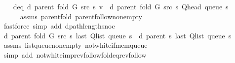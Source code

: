 \begin{isabellebody}
\ \ \isamarkupfalse%
\ d{\isacharunderscore}{\kern0pt}eq{\isacharcolon}{\kern0pt}\ {\isachardoublequoteopen}d\ {\isacharparenleft}{\kern0pt}parent\ {\isacharparenleft}{\kern0pt}fold\ G\ src\ s{\isacharparenright}{\kern0pt}{\isacharparenright}{\kern0pt}\ v\ {\isacharequal}{\kern0pt}\ d\ {\isacharparenleft}{\kern0pt}parent\ {\isacharparenleft}{\kern0pt}fold\ G\ src\ s{\isacharparenright}{\kern0pt}{\isacharparenright}{\kern0pt}\ {\isacharparenleft}{\kern0pt}Q{\isacharunderscore}{\kern0pt}head\ {\isacharparenleft}{\kern0pt}queue\ s{\isacharparenright}{\kern0pt}{\isacharparenright}{\kern0pt}\ {\isacharplus}{\kern0pt}\ {}{\isachardoublequoteclose}\isanewline
\ \ \ \ \isamarkupfalse%
\ assms{\isacharparenleft}{\kern0pt}{}{\isacharparenright}{\kern0pt}\ parent{\isacharunderscore}{\kern0pt}fold\ parent{\isachardot}{\kern0pt}follow{\isacharunderscore}{\kern0pt}non{\isacharunderscore}{\kern0pt}empty\isanewline
\ \ \ \ \isamarkupfalse%
\ {\isacharparenleft}{\kern0pt}fastforce\ simp\ add{\isacharcolon}{\kern0pt}\ dpath{\isacharunderscore}{\kern0pt}length{\isacharunderscore}{\kern0pt}snoc{\isacharparenright}{\kern0pt}\isanewline
\isanewline
\ \ \isamarkupfalse%
\ {\isachardoublequoteopen}d\ {\isacharparenleft}{\kern0pt}parent\ {\isacharparenleft}{\kern0pt}fold\ G\ src\ s{\isacharparenright}{\kern0pt}{\isacharparenright}{\kern0pt}\ {\isacharparenleft}{\kern0pt}last\ {\isacharparenleft}{\kern0pt}Q{\isacharunderscore}{\kern0pt}list\ {\isacharparenleft}{\kern0pt}queue\ s{\isacharparenright}{\kern0pt}{\isacharparenright}{\kern0pt}{\isacharparenright}{\kern0pt}\ {\isacharequal}{\kern0pt}\ d\ {\isacharparenleft}{\kern0pt}parent\ s{\isacharparenright}{\kern0pt}\ {\isacharparenleft}{\kern0pt}last\ {\isacharparenleft}{\kern0pt}Q{\isacharunderscore}{\kern0pt}list\ {\isacharparenleft}{\kern0pt}queue\ s{\isacharparenright}{\kern0pt}{\isacharparenright}{\kern0pt}{\isacharparenright}{\kern0pt}{\isachardoublequoteclose}\isanewline
\ \ \ \ \isamarkupfalse%
\ assms\ list{\isacharunderscore}{\kern0pt}queue{\isacharunderscore}{\kern0pt}non{\isacharunderscore}{\kern0pt}empty\ not{\isacharunderscore}{\kern0pt}white{\isacharunderscore}{\kern0pt}if{\isacharunderscore}{\kern0pt}mem{\isacharunderscore}{\kern0pt}queue\isanewline
\ \ \ \ \isamarkupfalse%
\ {\isacharparenleft}{\kern0pt}simp\ add{\isacharcolon}{\kern0pt}\ not{\isacharunderscore}{\kern0pt}white{\isacharunderscore}{\kern0pt}imp{\isacharunderscore}{\kern0pt}rev{\isacharunderscore}{\kern0pt}follow{\isacharunderscore}{\kern0pt}fold{\isacharunderscore}{\kern0pt}eq{\isacharunderscore}{\kern0pt}rev{\isacharunderscore}{\kern0pt}follow{\isacharparenright}{\kern0pt}\isanewline

\end{isabellebody}
